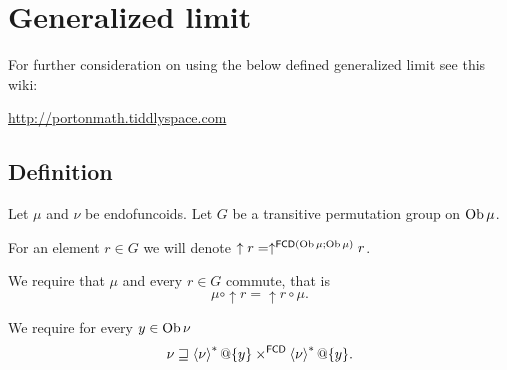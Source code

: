 \section{Generalized limit}

For further consideration on using the below defined generalized limit
see this wiki:

\href{http://portonmath.tiddlyspace.com}{http://portonmath.tiddlyspace.com}


\subsection{Definition}

Let $\mu$ and $\nu$ be endofuncoids. Let $G$ be a transitive permutation
group on $\operatorname{Ob}\mu$.

For an element $r\in G$ we will denote $\uparrow r=\uparrow^{\mathsf{FCD}(\operatorname{Ob}\mu;\operatorname{Ob}\mu)}r$.

We require that $\mu$ and every $r\in G$ commute, that is
\[
\mu\circ\uparrow r=\uparrow r\circ\mu.
\]


We require for every $y\in\operatorname{Ob}\nu$ 
\begin{equation}
\nu\sqsupseteq\left\langle \nu\right\rangle ^{\ast}@\{y\}\times^{\mathsf{FCD}}\left\langle \nu\right\rangle ^{\ast}@\{y\}.\label{lim-squares}
\end{equation}

